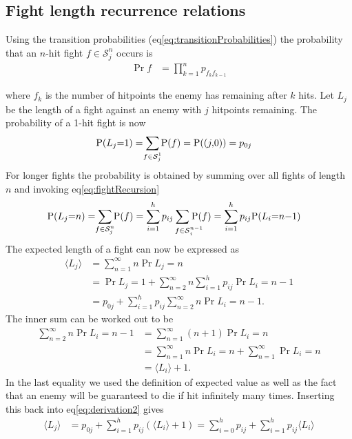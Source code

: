 \subsection{Fight length recurrence relations}
Using the transition probabilities (eq\ref{eq:transitionProbabilities}) the probability that an $n$-hit fight $f \in \mathcal{S}_{j}^n$ occurs is
\begin{align}
    \Pr{f} &= \prod_{k=1}^{n} p_{f_{k} f_{k-1}}
\end{align}

where $f_k$ is the number of hitpoints the enemy has remaining after $k$ hits.
Let $L_j$ be the length of a fight against an enemy with $j$ hitpoints remaining. The probability of a 1-hit fight is now
\begin{align}\label{eq:probabilityRecursion1hit}
    \Pr{L_j = 1} &= \sum_{\mathclap{f \in \mathcal{S}_j^1}}\Pr{f}
            = \Pr{(j,0}) = p_{0j}
\end{align}
For longer fights the probability is obtained by summing over all fights of length $n$ and invoking eq\ref{eq:fightRecursion}
\begin{align}\label{eq:probabilityRecursion}
    \Pr{L_j = n} &= \sum_{\mathclap{f \in \mathcal{S}_j^n}}\Pr{f}
            = \sum_{i=1}^h p_{ij} \sum_{f \in \mathcal{S}\mathrlap{_i^{n-1}}}\Pr{f}
            = \sum_{i=1}^h p_{ij} \Pr{L_i = n-1}
\end{align}
The expected length of a fight can now be expressed as
\begin{align}
	\langle L_j \rangle &= \sum_{n=1}^{\infty}n\Pr{L_j=n}\nonumber\\
       &= \Pr{L_j=1} + \sum_{n=2}^{\infty}n\sum_{i=1}^h p_{ij} \Pr{L_i=n-1}\nonumber\\
       &= p_{0j} + \sum_{i=1}^h p_{ij} \sum_{n=2}^{\infty}n\Pr{L_i=n-1}.\label{eq:derivation2}
\end{align}
The inner sum can be worked out to be
\begin{align}
    \sum_{n=2}^{\infty}n\Pr{L_i=n-1}
       &= \sum_{n=1}^{\infty}(n+1)\Pr{L_i=n} \nonumber\\
	   &= \sum_{n=1}^{\infty}n\Pr{L_i=n} + \sum_{n=1}^{\infty}\Pr{L_i=n}\nonumber\\
	   &= \langle L_i \rangle + 1.
\end{align}
In the last equality we used the definition of expected value as well as the fact that an enemy will be guaranteed to die if hit infinitely many times. Inserting this back into eq\ref{eq:derivation2} gives
\begin{align}
    \langle L_j \rangle
        &= p_{0j} + \sum_{i=1}^h p_{ij}(\langle L_i \rangle+1)
        = \sum_{i=0}^h p_{ij} + \sum_{i=1}^h p_{ij}\langle L_i \rangle
\end{align}
